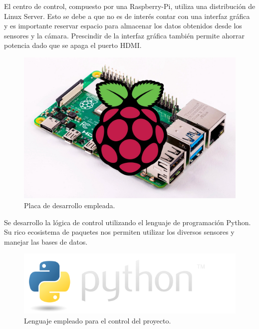 El centro de control, compuesto por una Raspberry-Pi, utiliza una distribución de Linux Server. Esto se debe a que no es de interés contar con una interfaz gráfica y es importante reservar espacio para almacenar los datos obtenidos desde los sensores y la cámara. 
Prescindir de la interfaz gráfica también permite ahorrar potencia dado que se apaga el puerto HDMI.

\begin{figure}[H]
	\centering
	\includegraphics[width=0.7\linewidth]{"../Ingenieria de Detalle/ImagenesIngenieria de Detalle/rpi_with_board"}
	\caption{Placa de desarrollo empleada.}
\end{figure}



Se desarrollo la lógica de control utilizando el lenguaje de programación Python. Su rico ecosistema de paquetes nos permiten utilizar los diversos sensores y manejar las bases de datos.

\begin{figure}[H]
	\centering
	\includegraphics[width=0.7\linewidth]{"../Ingenieria de Detalle/ImagenesIngenieria de Detalle/python-logo@2x"}
	\caption{Lenguaje empleado para el control del proyecto.}
\end{figure}










